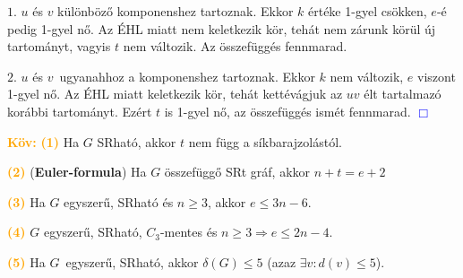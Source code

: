 \documentclass[../szamtud.tex]{subfiles}
\begin{document}
        $\boxed{1.}$ $u$ és $v$ különböző komponenshez tartoznak. Ekkor $k$ értéke 1-gyel csökken, $e$-é pedig 1-gyel nő. Az ÉHL miatt nem keletkezik kör, tehát nem zárunk körül új tartományt, vagyis $t$ nem változik. Az összefüggés fennmarad.

        $\boxed{2.}$ $u$ és $v$ ugyanahhoz a komponenshez tartoznak. Ekkor $k$ nem változik, $e$ viszont 1-gyel nő. Az ÉHL miatt keletkezik kör, tehát kettévágjuk az $uv$ élt tartalmazó korábbi tartományt. Ezért $t$ is 1-gyel nő, az összefüggés ismét fennmarad. \textcolor{blue}{$\Box$}

        \textcolor{orange}{\textbf{Köv:}} \textcolor{orange}{\textbf{(1)}} Ha $G$ SRható, akkor $t$ nem függ a síkbarajzolástól.


        \textcolor{orange}{\textbf{(2)}} (\textbf{Euler-formula}) Ha $G$ összefüggő SRt gráf, akkor $n + t = e + 2$


        \textcolor{orange}{\textbf{(3)}} Ha $G$ egyszerű, SRható és $n \geq 3$, akkor $e \leq 3n - 6$.


        \textcolor{orange}{\textbf{(4)}} $G$ egyszerű, SRható, $C_3$-mentes és $n \geq 3 \Rightarrow e \leq 2n - 4$. 


        \textcolor{orange}{\textbf{(5)}} Ha $G$ egyszerű, SRható, akkor $\delta(G) \leq 5$ (azaz $\exists v : d(v) \leq 5$).

\end{document}
